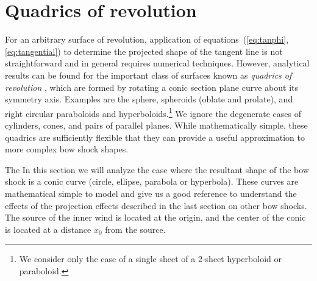 \section{Quadrics of revolution}
\label{sec:conic}

\newcommand\Sin{\ensuremath{\mathcal{S}}}
\newcommand\Cos{\ensuremath{\mathcal{C}}}
\newcommand\Cot{\ensuremath{\mathcal{T}}}

For an arbitrary surface of revolution, application of
equations~(\ref{eq:tanphi}, \ref{eq:tangential}) to determine the
projected shape of the tangent line is not straightforward and in
general requires numerical techniques.  However, analytical results
can be found for the important class of surfaces known as
\textit{quadrics of revolution} \citep{Goldman:1983a, Gfrerrer:2009a},
which are formed by rotating a conic section plane curve about its
symmetry axis.  Examples are the sphere, spheroids (oblate and
prolate), and right circular paraboloids and hyperboloids.\footnote{We
  consider only the case of a single sheet of a 2-sheet hyperboloid or
  paraboloid.}  We ignore the degenerate cases of cylinders, cones,
and pairs of parallel planes.  While mathematically simple, these
quadrics are sufficiently flexible that they can provide a useful
approximation to more complex bow shock shapes. 

The 
In this section we will analyze the case where the resultant shape  of the bow shock is a conic curve (circle, ellipse, parabola or hyperbola).
These curves are mathematical simple to model and give us a good reference to understand the effects of the projection effects
described in the last section on other bow shocks. The source of the inner wind is located at the origin, and the center of the conic is located at
a distance $x_0$ from the source.

